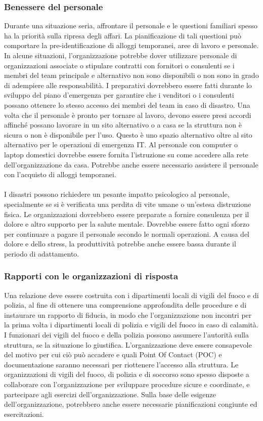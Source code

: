 \documentclass[12pt, a4paper, titlepage]{report}
\begin{document}
			\subsubsection{Benessere del personale}
				Durante una situazione seria, affrontare il personale e le questioni familiari spesso ha la priorità sulla ripresa degli affari. La pianificazione di tali questioni può comportare la pre-identificazione di alloggi temporanei, aree di lavoro e personale. In alcune situazioni, l'organizzazione potrebbe dover utilizzare personale di organizzazioni associate o stipulare contratti con fornitori o consulenti se i membri del team principale e alternativo non sono disponibili o non sono in grado di adempiere alle responsabilità. I preparativi dovrebbero essere fatti durante lo sviluppo del piano d'emergenza per garantire che i venditori o i consulenti possano ottenere lo stesso accesso dei membri del team in caso di disastro. Una volta che il personale è pronto per tornare al lavoro, devono essere presi accordi affinché possano lavorare in un sito alternativo o a casa se la struttura non è sicura o non è disponibile per l'uso. Questo è uno spazio alternativo oltre al sito alternativo per le operazioni di emergenza IT. Al personale con computer o laptop domestici dovrebbe essere fornita l'istruzione su come accedere alla rete dell'organizzazione da casa. Potrebbe anche essere necessario assistere il personale con l'acquisto di alloggi temporanei.\\
				\\I disastri possono richiedere un pesante impatto psicologico al personale, specialmente se si è verificata una perdita di vite umane o un'estesa distruzione fisica. Le organizzazioni dovrebbero essere preparate a fornire consulenza per il dolore e altro supporto per la salute mentale. Dovrebbe essere fatto ogni sforzo per continuare a pagare il personale secondo le normali operazioni. A causa del dolore e dello stress, la produttività potrebbe anche essere bassa durante il periodo di adattamento.
				
			\subsubsection{Rapporti con le organizzazioni di risposta}
				Una relazione deve essere costruita con i dipartimenti locali di vigili del fuoco e di polizia, al fine di ottenere una comprensione approfondita delle procedure e di instaurare un rapporto di fiducia, in modo che l'organizzazione non incontri per la prima volta i dipartimenti locali di polizia e vigili del fuoco in caso di calamità. I funzionari dei vigili del fuoco e della polizia possono assumere l'autorità sulla struttura, se la situazione lo giustifica. L'organizzazione deve essere consapevole del motivo per cui ciò può accadere e quali Point Of Contact (POC) e documentazione saranno necessari per riottenere l'accesso alla struttura. Le organizzazioni di vigili del fuoco, di polizia e di soccorso sono spesso disposte a collaborare con l'organizzazione per sviluppare procedure sicure e coordinate, e partecipare agli esercizi dell'organizzazione. Sulla base delle esigenze dell'organizzazione, potrebbero anche essere necessarie pianificazioni congiunte ed esercitazioni.
				
\end{document}
